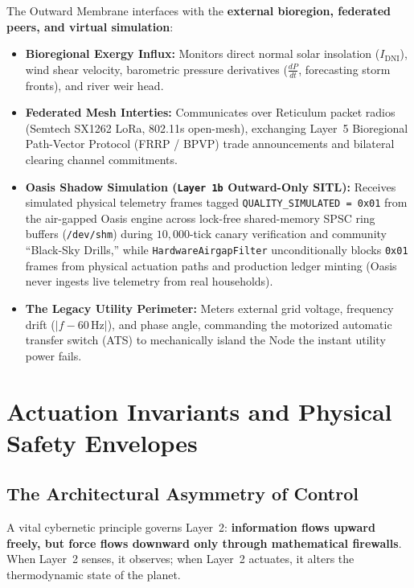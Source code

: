 The Outward Membrane interfaces with the \textbf{external bioregion, federated peers, and virtual simulation}:
\begin{itemize}
    \item \textbf{Bioregional Exergy Influx:} Monitors direct normal solar insolation ($I_{\mathrm{DNI}}$), wind shear velocity, barometric pressure derivatives ($\frac{dP}{dt}$, forecasting storm fronts), and river weir head.
    \item \textbf{Federated Mesh Interties:} Communicates over Reticulum packet radios (Semtech SX1262 LoRa, 802.11s open-mesh), exchanging Layer~5 Bioregional Path-Vector Protocol (FRRP / BPVP) trade announcements and bilateral clearing channel commitments.
    \item \textbf{Oasis Shadow Simulation (\texttt{Layer 1b} Outward-Only SITL):} Receives simulated physical telemetry frames tagged \texttt{QUALITY\_SIMULATED = 0x01} from the air-gapped Oasis engine across lock-free shared-memory SPSC ring buffers (\texttt{/dev/shm}) during $10{,}000$-tick canary verification and community ``Black-Sky Drills,'' while \texttt{HardwareAirgapFilter} unconditionally blocks \texttt{0x01} frames from physical actuation paths and production ledger minting (Oasis never ingests live telemetry from real households).
    \item \textbf{The Legacy Utility Perimeter:} Meters external grid voltage, frequency drift ($|f - 60\,\mathrm{Hz}|$), and phase angle, commanding the motorized automatic transfer switch (ATS) to mechanically island the Node the instant utility power fails.
\end{itemize}

\section{Actuation Invariants and Physical Safety Envelopes}
\label{sec:l2_actuation_invariants}

\subsection{The Architectural Asymmetry of Control}

A vital cybernetic principle governs Layer~2: \textbf{information flows upward freely, but force flows downward only through mathematical firewalls}. When Layer~2 senses, it observes; when Layer~2 actuates, it alters the thermodynamic state of the planet.

